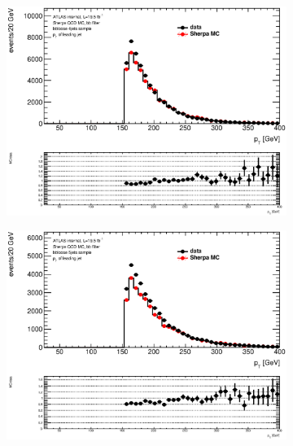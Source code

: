 \begin{figure}[phtb!]
\begin{center}
  \begin{subfigure}[$bbloose$ 4 jet category]{0.3\textwidth}\includegraphics[width=\textwidth]{MonteCarlo/figures/pt0_bbloose_4jets.eps}\end{subfigure}
  \begin{subfigure}[$bbloose$ 5+ jet category]{0.3\textwidth}\includegraphics[width=\textwidth]{MonteCarlo/figures/pt0_bbloose_5jets.eps}\end{subfigure}

\end{center}
\end{figure}
